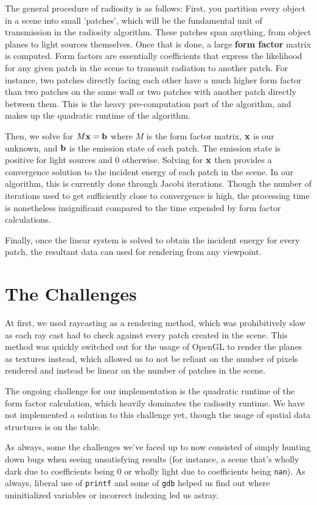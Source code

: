 \documentclass{article}
\begin{document}
\begin{multicols}{2}
The general procedure of radiosity is as follows: First, you partition every object in a scene into small 'patches', which will be the fundamental unit of transmission in the radiosity algorithm. These patches span anything, from object planes to light sources themselves. Once that is done, a large {\bf form factor} matrix is computed. Form factors are essentially coefficients that express the likelihood for any given patch in the scene to transmit radiation to another patch. For instance, two patches directly facing each other have a much higher form factor than two patches on the same wall or two patches with another patch directly between them. This is the heavy pre-computation part of the algorithm, and makes up the quadratic runtime of the algorithm.

Then, we solve for $M{\bf x} = {\bf b}$ where $M$ is the form factor matrix, ${\bf x}$ is our unknown, and ${\bf b}$ is the emission state of each patch. The emission state is positive for light sources and 0 otherwise. Solving for ${\bf x}$ then provides a convergence solution to the incident energy of each patch in the scene. In our algorithm, this is currently done through Jacobi iterations. Though the number of iterations used to get sufficiently close to convergence is high, the processing time is nonetheless insignificant compared to the time expended by form factor calculations.

Finally, once the linear system is solved to obtain the incident energy for every patch, the resultant data can used for rendering from any viewpoint.

\section{The Challenges}
At first, we used raycasting as a rendering method, which was prohibitively slow as each ray cast had to check against every patch created in the scene. This method was quickly switched out for the usage of OpenGL to render the planes as textures instead, which allowed us to not be reliant on the number of pixels rendered and instead be linear on the number of patches in the scene.

The ongoing challenge for our implementation is the quadratic runtime of the form factor calculation, which heavily dominates the radiosity runtime. We have not implemented a solution to this challenge yet, though the usage of spatial data structures is on the table.

As always, some the challenges we've faced up to now consisted of simply hunting down bugs when seeing unsatisfying results (for instance, a scene that's wholly dark due to coefficients being 0 or wholly light due to coefficients being \verb|nan|). As always, liberal use of \verb|printf| and some of \verb|gdb| helped us find out where uninitialized variables or incorrect indexing led us astray.


\end{multicols}
\end{document}
